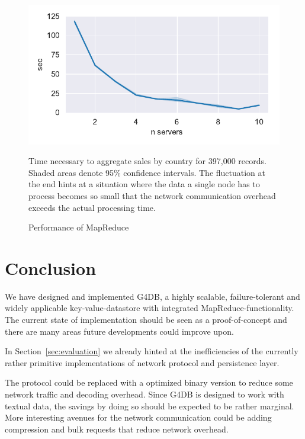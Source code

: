 %

\begin{figure}[]
	\centering
	\includegraphics[width=0.8\linewidth]{resources/mr_sim}
	\caption{Performance of MapReduce}
	\label{fig:perf:mr}
	{
	Time necessary to aggregate sales by country for 397,000 records.
	Shaded areas denote 95\% confidence intervals.
	The fluctuation at the end hints at a situation where the data
	a single node has to process becomes so small that the network
	communication overhead exceeds the actual processing time.
	}
\end{figure}

\section{Conclusion}
\label{sec:conclusion}

We have designed and implemented G4DB, a highly scalable, failure-tolerant and
widely applicable key-value-datastore with integrated MapReduce-functionality.\\[1em]

The current state of implementation should be seen as a proof-of-concept
and there are many areas future developments could improve upon.

In Section~\ref{sec:evaluation} we already hinted at the inefficiencies of the
currently rather primitive implementations of network protocol and persistence layer.

The protocol could be replaced with a optimized binary version to reduce
some network traffic and decoding overhead.
Since G4DB is designed to work with textual data, the savings by doing so
should be expected to be rather marginal.
More interesting avenues for the network communication could be adding compression
and bulk requests that reduce network overhead.

